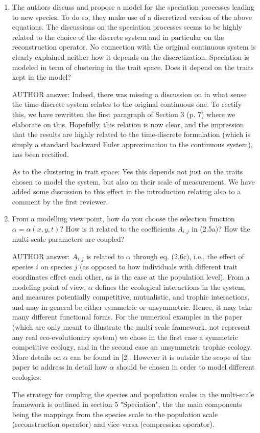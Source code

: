 \documentclass[a4paper,11pt]{scrartcl}
\begin{document}
\begin{enumerate}
\item
The authors discuss and propose a model for the speciation processes leading to new species. To do so, they make use of a discretized version of the above equations. The discussions on the speciation processes seems to be highly related to the choice of the discrete system and in particular on the reconstruction operator. No connection with the original continuous system is clearly explained neither how it depends on the discretization.
Speciation is modeled in term of clustering in the trait space. Does it depend on the traits kept in the model?

AUTHOR answer: Indeed, there was missing a discussion on in what sense the time-discrete system relates to the original continuous one. To rectify this, we have rewritten the first paragraph of Section 3 (p. 7) where we elaborate on this. Hopefully, this relation is now clear, and the impression that the results are highly related to the time-discrete formulation (which is simply a standard backward Euler approximation to the continuous system), has been rectified.

As to the clustering in trait space: Yes this depends not just on the traits chosen to model the system, but also on their scale of measurement. We have added some discussion to this effect in the introduction relating also to a comment by the first reviewer. 

\item
From a modelling view point, how do you choose the selection function $\alpha=\alpha(x,y,t)$? How is it related to the coefficients $A_{i,j}$ in (2.5a)? How the multi-scale parameters are coupled?

AUTHOR answer: $A_{i,j}$ is related to $\alpha$ through eq. (2.6c), i.e., the effect of species $i$ on species $j$ (as opposed to how individuals with different trait coordinates effect each other, as is the case at the population level). From a modeling point of view, $\alpha$ defines the ecological interactions in the system, and measures potentially competitive, mutualistic, and trophic interactions, and may in general be either symmetric or unsymmetric. Hence, it may take many different functional forms. For the numerical examples in the paper (which are only meant to illustrate the multi-scale framework, not represent any real eco-evolutionary system) we chose in the first case a symmetric competitive ecology, and in the second case an unsymmetric trophic ecology. More details on $\alpha$ can be found in [2]. However it is outside the scope of the paper to address in detail how $\alpha$ should be chosen in order to model different ecologies.

The strategy for coupling the species and population scales in the multi-scale framework is outlined in section 5 "Speciation", the the main components being the mappings from the species scale to the population scale (reconstruction operator) and vice-versa (compression operator).
\end{enumerate}
\end{document}
